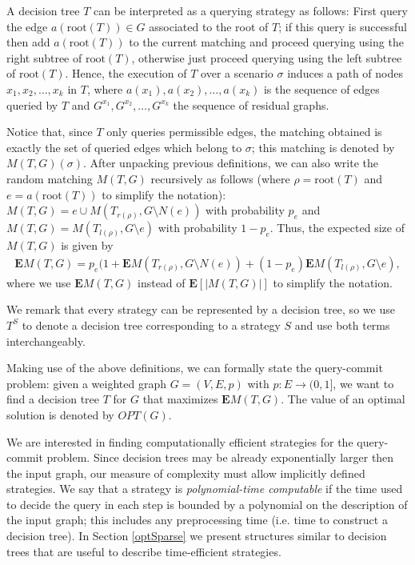 \documentclass[12pt]{article}
\newcommand{\E}[1]{\mathbf{E}\left[#1\right]}
\newcommand{\ro}[1]{\textrm{root}(#1)}
\newcommand{\Mf}[2]{M(#1,#2)}
\newcommand{\EMf}[2]{\mathbf{E}M(#1,#2)}
\begin{document}
	A decision tree $T$ can be interpreted as a querying strategy as follows: First query the edge $a(\ro{T}) \in G$ associated to the root of $T$; if this query is successful then add $a(\ro{T})$ to the current matching and proceed querying using the right subtree of $\ro{T}$, otherwise just proceed querying using the left subtree of $\ro{T}$. Hence, the execution of $T$ over a scenario $\sigma$ induces a path of nodes $x_1, x_2, \ldots, x_k$ in $T$, where $a(x_1), a(x_2), \ldots, a(x_k)$ is the sequence of edges queried by $T$ and $G^{x_1}, G^{x_2}, \ldots, G^{x_k}$ the sequence of residual graphs. 
	
	Notice that, since $T$ only queries permissible edges, the matching obtained is exactly the set of queried edges which belong to $\sigma$; this matching is denoted by $\Mf{T}{G}(\sigma)$. After unpacking previous definitions, we can also write the random matching $\Mf{T}{G}$ recursively as follows (where $\rho = \ro{T}$ and $e = a(\ro{T})$ to simplify the notation): $\Mf{T}{G} = e \cup \Mf{T_{r(\rho)}}{G \setminus N(e)}$ with probability $p_{e}$ and $\Mf{T}{G} = \Mf{T_{l(\rho)}}{G \setminus e}$ with probability $1 - p_{e}$. Thus, the expected size of $\Mf{T}{G}$ is given by
\begin{eqnarray} 
		\EMf{T}{G} = p_{e} (1 + \EMf{T_{r(\rho)}}{G \setminus N(e)} + (1 - p_{e}) \EMf{T_{l(\rho)}}{G \setminus e}, \label{ESrec}
	\end{eqnarray}
	where we use $\EMf{T}{G}$ instead of $\E{|M(T,G)|}$ to simplify the notation. 
			
	We remark that every strategy can be represented by a decision tree, so we use $T^S$ to denote a decision tree corresponding to a strategy $S$ and use both terms interchangeably.
	
	Making use of the above definitions, we can formally state the query-commit problem: given a weighted graph $G = (V, E, p)$ with $p : E \rightarrow (0,1]$, we want to find a decision tree $T$ for $G$ that maximizes $\EMf{T}{G}$. The value of an optimal solution is denoted by $OPT(G)$.
		
	We are interested in finding computationally efficient strategies for the query-commit problem. Since decision trees may be already exponentially larger then the input graph, our measure of complexity must allow implicitly defined strategies. We say that a strategy is \emph{polynomial-time computable} if the time used to decide the query in each step is bounded by a polynomial on the description of the input graph; this includes any preprocessing time (i.e. time to construct a decision tree). In Section \ref{optSparse} we present structures similar to decision trees that are useful to describe time-efficient strategies.
		
\end{document}
